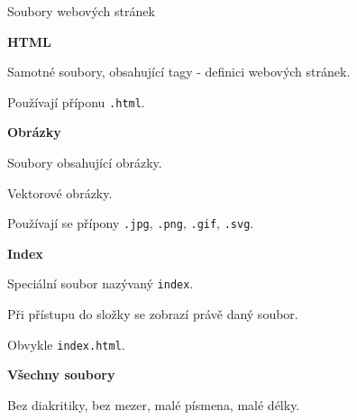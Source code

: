 \documentclass[aspectratio=169]{beamer}
\begin{document}
\begin{frame}{Soubory webových stránek}
    \begin{multicols}{2}
        \centering
        \begin{cardTiny}
            \textbf{HTML}

            \begin{flushleft}
            Samotné soubory, obsahující tagy - definici webových stránek. 

            Používají příponu \texttt{.html}.
            \end{flushleft}
        \end{cardTiny}
        \begin{cardTiny}
            \textbf{Obrázky}


            \begin{flushleft}
            Soubory obsahující obrázky.

            Vektorové obrázky.

            Používají se přípony \texttt{.jpg}, \texttt{.png}, \texttt{.gif},  \texttt{.svg}.
            \end{flushleft}
        \end{cardTiny}
        \begin{cardTiny}
            \textbf{Index}

            \begin{flushleft}

            Speciální soubor nazývaný \texttt{index}.

            Při přístupu do složky se zobrazí právě daný soubor.

            Obvykle \texttt{index.html}. 
            \end{flushleft}
        \end{cardTiny}
        \begin{cardTiny}
            \textbf{Všechny soubory}


            \begin{flushleft}
            Bez diakritiky, bez mezer, malé písmena, malé délky.
            \end{flushleft}
        \end{cardTiny}
    \end{multicols}
\end{frame}
\end{document}
